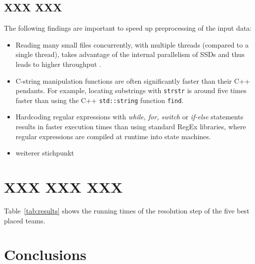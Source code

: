\documentclass[sigconf]{acmart}
\begin{document}
\subsection{XXX XXX}
\label{sub:sec:XXX XXX}

The following findings are important to speed up preprocessing of the input data:

\begin{itemize}

\item Reading many small files concurrently, with multiple threads (compared to a single thread), takes advantage of the internal parallelism of SSDs and thus leads to higher throughput \cite{Zhuang2016}.

\item C-string manipulation functions are often significantly faster than their C++ pendants. For example, locating substrings with \texttt{strstr} is around five times faster than using the C++ \texttt{std::string} function \texttt{find}.

\item Hardcoding regular expressions with \emph{while, for, switch} or \emph{if-else} statements results in faster execution times than using standard RegEx libraries, where regular expressions are compiled at runtime into state machines.

\item weiterer stichpunkt

\end{itemize}



\section{XXX XXX XXX}

Table~\ref{tab:results} shows the running times of the resolution step of the five best placed teams.


\begin{table}[htbp]
  \caption{Beschreibung}
  \label{tab:results}
\end{table}


\section{Conclusions}



\end{document}
